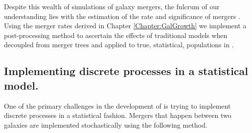 Despite this wealth of simulations of galaxy mergers, the fulcrum of our understanding lies with the estimation of the rate and significance of mergers \cite{Hopkins2010MERGERSMATTER, Hopkins2010MergersRate}. Using the merger rates derived in Chapter \ref{Chapter:GalGrowth} we implement a post-processing method to ascertain the effects of traditional models when decoupled from merger trees and applied to true, statistical, populations in \steel.

\subsection{Implementing discrete processes in a statistical model.}

One of the primary challenges in the development of \steel is trying to implement discrete processes in a statistical fashion. Mergers that happen between two galaxies are implemented stochastically using the following method.
